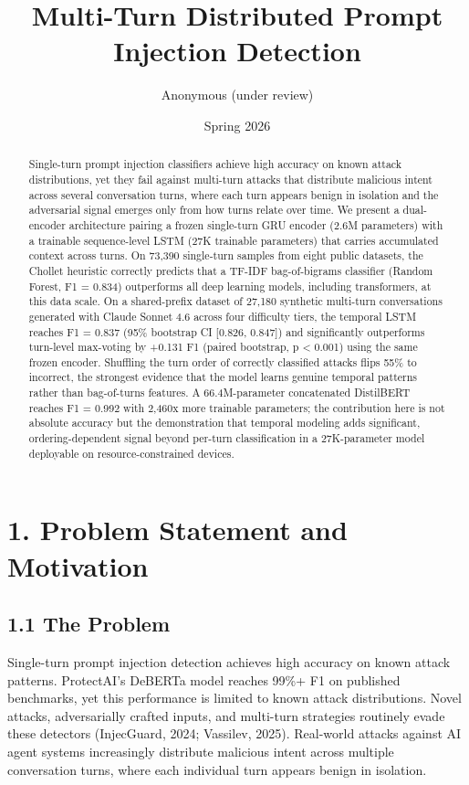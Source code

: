 \documentclass[
  11pt,
]{report}
\title{Multi-Turn Distributed Prompt Injection Detection}
\author{Anonymous (under review)}
\date{Spring 2026}
\begin{document}
\maketitle
\begin{abstract}
Single-turn prompt injection classifiers achieve high accuracy on known
attack distributions, yet they fail against multi-turn attacks that
distribute malicious intent across several conversation turns, where
each turn appears benign in isolation and the adversarial signal emerges
only from how turns relate over time. We present a dual-encoder
architecture pairing a frozen single-turn GRU encoder (2.6M parameters)
with a trainable sequence-level LSTM (27K trainable parameters) that
carries accumulated context across turns. On 73,390 single-turn samples
from eight public datasets, the Chollet heuristic correctly predicts
that a TF-IDF bag-of-bigrams classifier (Random Forest, F1 = 0.834) outperforms all
deep learning models, including transformers, at this data scale. On a
shared-prefix dataset of 27,180 synthetic multi-turn conversations
generated with Claude Sonnet 4.6 across four difficulty tiers, the
temporal LSTM reaches F1 = 0.837 (95\% bootstrap CI {[}0.826, 0.847{]})
and significantly outperforms turn-level max-voting by +0.131 F1 (paired
bootstrap, p \textless{} 0.001) using the same frozen encoder. Shuffling
the turn order of correctly classified attacks flips 55\% to incorrect,
the strongest evidence that the model learns genuine temporal patterns
rather than bag-of-turns features. A 66.4M-parameter concatenated
DistilBERT reaches F1 = 0.992 with 2,460x more trainable parameters; the
contribution here is not absolute accuracy but the demonstration that
temporal modeling adds significant, ordering-dependent signal beyond
per-turn classification in a 27K-parameter model deployable on
resource-constrained devices.
\end{abstract}

{
\setcounter{tocdepth}{2}
\tableofcontents
}
\section{1. Problem Statement and
Motivation}\label{problem-statement-and-motivation}

\subsection{1.1 The Problem}\label{the-problem}

Single-turn prompt injection detection achieves high accuracy on known
attack patterns. ProtectAI's DeBERTa model reaches 99\%+ F1 on published
benchmarks, yet this performance is limited to known attack
distributions. Novel attacks, adversarially crafted inputs, and
multi-turn strategies routinely evade these detectors (InjecGuard, 2024;
Vassilev, 2025). Real-world attacks against AI agent systems
increasingly distribute malicious intent across multiple conversation
turns, where each individual turn appears benign in isolation.
\end{document}
